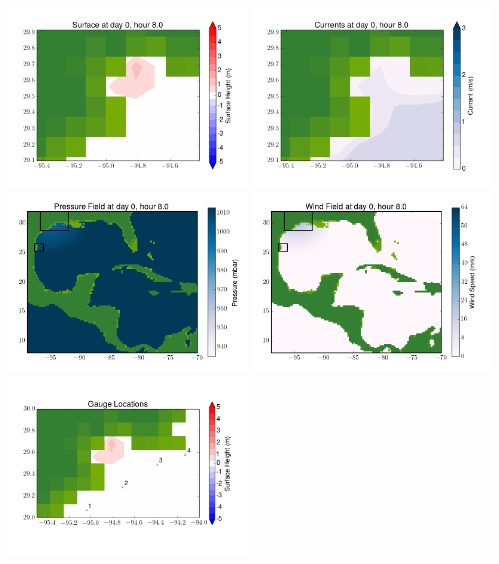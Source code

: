 \documentclass[11pt]{article}
\begin{document}
\includegraphics[width=0.475\textwidth]{frame0080fig6.png}
\vskip 10pt 
\includegraphics[width=0.475\textwidth]{frame0080fig7.png}
\includegraphics[width=0.475\textwidth]{frame0080fig8.png}
\vskip 10pt 
\includegraphics[width=0.475\textwidth]{frame0080fig9.png}
\includegraphics[width=0.475\textwidth]{frame0080fig10.png}
\end{document}
